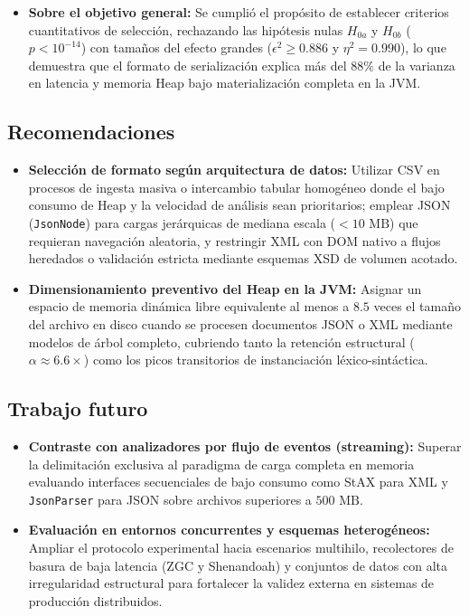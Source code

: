 \begin{itemize}
    \item \textbf{Sobre el objetivo general:} Se cumplió el propósito de establecer criterios cuantitativos de selección, rechazando las hipótesis nulas $H_{0a}$ y $H_{0b}$ ($p < 10^{-14}$) con tamaños del efecto grandes ($\epsilon^{2} \ge 0.886$ y $\eta^{2} = 0.990$), lo que demuestra que el formato de serialización explica más del $88\%$ de la varianza en latencia y memoria Heap bajo materialización completa en la JVM.
\end{itemize}

\subsection{Recomendaciones}

\begin{itemize}
    \item \textbf{Selección de formato según arquitectura de datos:} Utilizar CSV en procesos de ingesta masiva o intercambio tabular homogéneo donde el bajo consumo de Heap y la velocidad de análisis sean prioritarios; emplear JSON (\texttt{JsonNode}) para cargas jerárquicas de mediana escala ($< 10\text{ MB}$) que requieran navegación aleatoria, y restringir XML con DOM nativo a flujos heredados o validación estricta mediante esquemas XSD de volumen acotado.
    \item \textbf{Dimensionamiento preventivo del Heap en la JVM:} Asignar un espacio de memoria dinámica libre equivalente al menos a $8.5$ veces el tamaño del archivo en disco cuando se procesen documentos JSON o XML mediante modelos de árbol completo, cubriendo tanto la retención estructural ($\alpha \approx 6.6\times$) como los picos transitorios de instanciación léxico-sintáctica.
\end{itemize}

\subsection{Trabajo futuro}

\begin{itemize}
    \item \textbf{Contraste con analizadores por flujo de eventos (streaming):} Superar la delimitación exclusiva al paradigma de carga completa en memoria evaluando interfaces secuenciales de bajo consumo como StAX para XML y \texttt{JsonParser} para JSON sobre archivos superiores a $500\text{ MB}$.
    \item \textbf{Evaluación en entornos concurrentes y esquemas heterogéneos:} Ampliar el protocolo experimental hacia escenarios multihilo, recolectores de basura de baja latencia (ZGC y Shenandoah) y conjuntos de datos con alta irregularidad estructural para fortalecer la validez externa en sistemas de producción distribuidos.
\end{itemize}